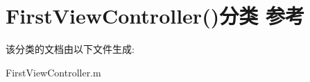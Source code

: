 \hypertarget{category_first_view_controller_07_08}{\section{First\-View\-Controller()分类 参考}
\label{category_first_view_controller_07_08}
}


该分类的文档由以下文件生成\-:\begin{DoxyCompactItemize}
\item 
First\-View\-Controller.\-m\end{DoxyCompactItemize}
